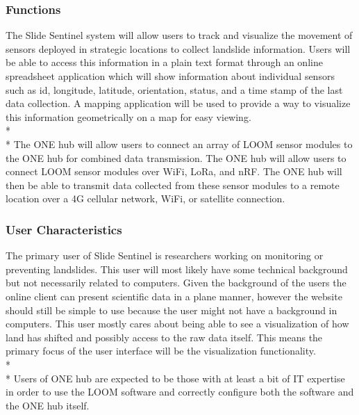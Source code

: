 \documentclass[onecolumn, draftclsnofoot,10pt, compsoc]{IEEEtran}
\begin{document}
\subsubsection{Functions}
The Slide Sentinel system will allow users to track and visualize the movement of sensors deployed in strategic locations to collect landslide information. Users will be able to access this information in a plain text format through an online spreadsheet application which will show information about individual sensors such as id, longitude, latitude, orientation, status, and a time stamp of the last data collection. A mapping application will be used to provide a way to visualize this information geometrically on a map for easy viewing.
\\* \\*
The ONE hub will allow users to connect an array of LOOM sensor modules to the ONE hub for combined data transmission. The ONE hub will allow users to connect LOOM sensor modules over WiFi, LoRa, and nRF. The ONE hub will then be able to transmit data collected from these sensor modules to a remote location over a 4G cellular network, WiFi, or satellite connection.


\subsubsection{User Characteristics}
The primary user of Slide Sentinel is researchers working on monitoring or preventing landslides. This user will most likely have some technical background but not necessarily related to computers. Given the background of the users the online client can present scientific data in a plane manner, however the website should still be simple to use because the user might not have a background in computers. This user mostly cares about being able to see a visualization of how land has shifted and possibly access to the raw data itself. This means the primary focus of the user interface will be the visualization functionality.
\\* \\*
Users of ONE hub are expected to be those with at least a bit of IT expertise in order to use the LOOM software and correctly configure both the software and the ONE hub itself.
\end{document}
